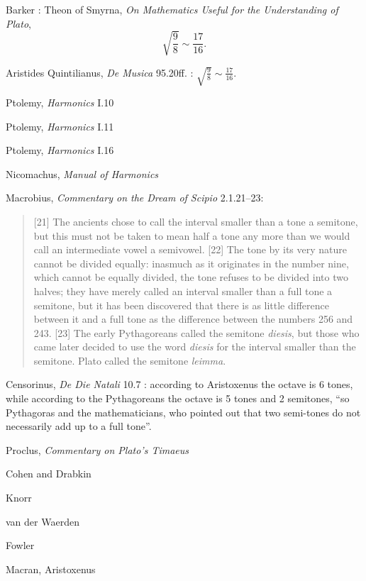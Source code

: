 \documentclass{article}
\theoremstyle{definition}
\begin{document}
Barker \cite[p.~223]{barker}: Theon of Smyrna, {\em On Mathematics Useful for the Understanding of Plato},
\[
\sqrt{\frac{9}{8}} \sim \frac{17}{16}.
\]

Aristides Quintilianus, {\em De Musica} 95.20ff. \cite[p.~496]{barker}: $\sqrt{\frac{9}{8}} \sim \frac{17}{16}$. 

Ptolemy, {\em Harmonics} I.10 \cite[pp.~297--298]{barker}

Ptolemy, {\em Harmonics} I.11 \cite[pp.~298--299]{barker}

Ptolemy, {\em Harmonics} I.16 \cite[pp.~312--313]{barker}

Nicomachus, {\em Manual of Harmonics}

Macrobius, {\em Commentary on the Dream of Scipio} \cite[pp.~188--189]{macrobius} 2.1.21--23:

\begin{quote}
[21] The ancients chose to call the interval smaller than a tone a semitone, but this must not be taken to mean half a tone
any more than we would call an intermediate vowel a semivowel. [22] The tone by its
very nature cannot be divided equally: inasmuch as it originates in the number nine, which cannot be equally divided,
the tone refuses to be divided into two halves; they have merely called an interval smaller than a full tone a semitone,
but it has been discovered that there is as little difference between it and a full tone as the difference
between the numbers 256 and 243. [23] The early Pythagoreans called the semitone {\em diesis}, but those who came later
decided to use the word {\em diesis} for the interval smaller than the semitone. Plato called the semitone
{\em leimma}.
\end{quote}

Censorinus, {\em De Die Natali} 10.7 \cite[p.~18]{censorinus}: according to Aristoxenus the octave is 6 tones, while
according to the Pythagoreans the octave is 5 tones and 2 semitones, ``so Pythagoras and the mathematicians, who pointed
out that two semi-tones do not necessarily add up to a full tone''.


Proclus, {\em Commentary on Plato's Timaeus} \cite{timaeum3II}

Cohen and Drabkin \cite[p.~286]{drabkin}


Knorr \cite{knorr}

van der Waerden \cite{waerden}

Fowler \cite{fowler}

Macran, Aristoxenus \cite{macran}




\end{document}
